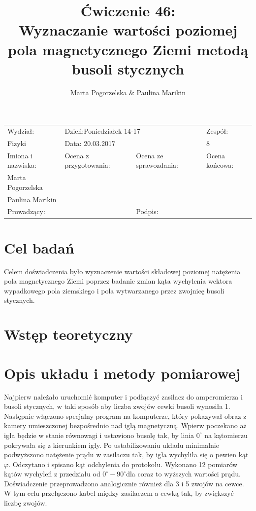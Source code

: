 \documentclass[a4paper,10pt]{article}
\def\arraystretch{1.2}
\begin{document}
\begin{table}
  \centering
  \def\arraystretch{1.5}
    \begin{tabular}{|l|l|l|l|} \hline
    Wydział:           & \multicolumn{2}{l|}{Dzień:Poniedziałek 14-17}    &Zespół:  \\
    Fizyki             &    \multicolumn{2}{l|}{Data: 20.03.2017}         &8             \\\hline
    Imiona i nazwiska: &Ocena z przygotowania:  &Ocena ze sprawozdania:   &Ocena końcowa: \\
    Marta Pogorzelska  &                        &                         &                \\
    Paulina Marikin    &                        &                         &\\\hline
    \multicolumn{2}{|l|}{Prowadzący:                 } &\multicolumn{2}{l|}{Podpis:             }  \\\hline
  \end{tabular}
\end{table}


\title{Ćwiczenie 46:\\Wyznaczanie wartości poziomej pola magnetycznego Ziemi metodą busoli stycznych}
\date{}
\author{Marta Pogorzelska \& Paulina Marikin}
\maketitle{}

\section{Cel badań}
Celem doświadczenia było wyznaczenie wartości składowej poziomej natężenia pola magnetycznego Ziemi poprzez badanie zmian kąta wychylenia wektora wypadkowego pola ziemskiego i pola wytwarzanego przez zwojnicę busoli stycznych.

\section{Wstęp teoretyczny}


\section{Opis układu i metody pomiarowej}
Najpierw należało uruchomić komputer i podłączyć zasilacz do amperomierza i busoli stycznych, w taki sposób aby liczba zwojów cewki busoli wynosiła 1. Następnie włączono specjalny program na komputerze, który pokazywał obraz z kamery umieszczonej bezpośrednio nad igłą magnetyczną. Wpierw poczekano aż igła będzie w stanie równowagi i ustawiono busolę tak, by linia $0^\circ$ na kątomierzu pokrywała się z kierunkiem igły. Po ustabilizowaniu układu minimalnie podwyższono natężenie prądu w zasilaczu tak, by igła wychyliła się o pewien kąt $\varphi$. Odczytano i spisano kąt odchylenia do protokołu. Wykonano 12 pomiarów kątów wychyleń z przedziału od $0^\circ - 90^\circ$dla coraz to wyższych wartości prądu. Doświadczenie przeprowadzono analogicznie również dla 3 i 5 zwojów na cewce. W tym celu przełączono kabel między zasilaczem a cewką tak, by zwiększyć liczbę zwojów. 
\end{document}
